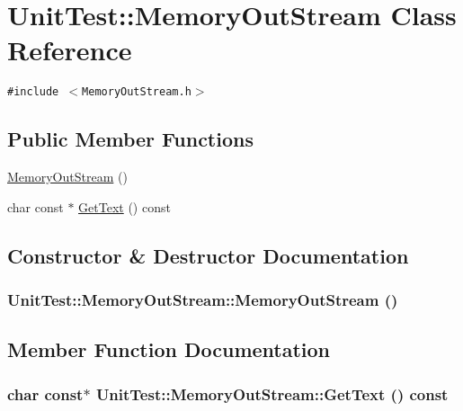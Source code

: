 \hypertarget{class_unit_test_1_1_memory_out_stream}{
\section{UnitTest::MemoryOutStream Class Reference}
\label{class_unit_test_1_1_memory_out_stream}
}
{\tt \#include $<$MemoryOutStream.h$>$}

\subsection*{Public Member Functions}
\begin{CompactItemize}
\item 
\hyperlink{class_unit_test_1_1_memory_out_stream_0f5bfc15679fa7734366a70bbf5a5e16}{MemoryOutStream} ()
\item 
char const $\ast$ \hyperlink{class_unit_test_1_1_memory_out_stream_52bb8a3fa38fee0096706a75cc232fb7}{GetText} () const 
\end{CompactItemize}


\subsection{Constructor \& Destructor Documentation}
\hypertarget{class_unit_test_1_1_memory_out_stream_0f5bfc15679fa7734366a70bbf5a5e16}{
\subsubsection[{MemoryOutStream}]{\setlength{\rightskip}{0pt plus 5cm}UnitTest::MemoryOutStream::MemoryOutStream ()}}
\label{class_unit_test_1_1_memory_out_stream_0f5bfc15679fa7734366a70bbf5a5e16}




\subsection{Member Function Documentation}
\hypertarget{class_unit_test_1_1_memory_out_stream_52bb8a3fa38fee0096706a75cc232fb7}{
\subsubsection[{GetText}]{\setlength{\rightskip}{0pt plus 5cm}char const$\ast$ UnitTest::MemoryOutStream::GetText () const}}
\label{class_unit_test_1_1_memory_out_stream_52bb8a3fa38fee0096706a75cc232fb7}




